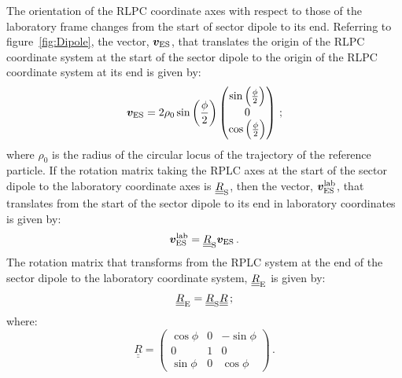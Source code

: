 The orientation of the RLPC coordinate axes with respect to those of
the laboratory frame changes from the start of sector dipole to its
end.
Referring to figure~\ref{fig:Dipole}, the vector, $\bm{v}_{\rm ES}$,
that translates the origin of the RLPC coordinate system at the start
of the sector dipole to the origin of the RLPC coordinate system at
its end is given by:
\begin{equation}
  \bm{v}_{\rm ES} = 2 \rho_0 \sin\left( \frac{\phi}{2} \right)
                     \begin{pmatrix}
                       \sin\left( \frac{\phi}{2} \right) \\
                       0                                 \\
                       \cos\left( \frac{\phi}{2} \right)
                     \end{pmatrix} \,;
\end{equation}
where $\rho_0$ is the radius of the circular locus of the trajectory
of the reference particle.
If the rotation matrix taking the RPLC axes at the start of the sector
dipole to the laboratory coordinate axes is
$\underline{\underline{R}}_{\rm S}$, then the vector,
$\bm{v}^{\rm lab}_{\rm ES}$, that translates from the start 
of the sector dipole to its end in laboratory coordinates is given by:
\begin{equation}
  \bm{v}^{\rm lab}_{\rm ES} = \underline{\underline{R}}_{\rm S} \bm{v}_{\rm ES} \,.
\end{equation}
The rotation matrix that transforms from the RPLC system at the end
of the sector dipole to the laboratory coordinate system,
$\underline{\underline{R}}_{\rm E}$ is given by:
\begin{equation}
  \underline{\underline{R}}_{\rm E} =
      \underline{\underline{R}}_{\rm S} \underline{\underline{R}} \, ;
\end{equation}
where:
\begin{equation}
  \underline{\underline{R}} = 
        \begin{pmatrix}
          \cos \phi & 0 & -\sin \phi \\
          0         & 1 &  0         \\
          \sin \phi & 0 &  \cos \phi 
        \end{pmatrix} \, .
\end{equation}

